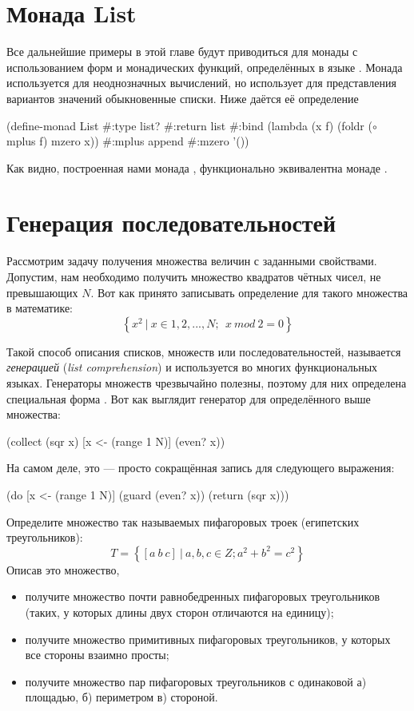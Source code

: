 \section[2]{Монада List}%
Все дальнейшие примеры в этой главе будут приводиться для монады  с использованием форм и монадических функций, определённых в языке \Scheme. Монада  используется для неоднозначных вычислений, но использует для представления вариантов значений обыкновенные списки. Ниже даётся её определение  

\begin{SchemeCode}
(define-monad List
  #:type list?
  #:return list
  #:bind (lambda (x f) (foldr ($\circ$ mplus f) mzero x))
  #:mplus append
  #:mzero '())
\end{SchemeCode}

Как видно, построенная нами монада , функционально эквивалентна монаде .

\section{Генерация последовательностей}%
Рассмотрим задачу получения множества величин с заданными свойствами. Допустим, нам необходимо получить множество квадратов чётных чисел, не превышающих $N$.  Вот как принято записывать определение для такого множества в математике:  $$\left\{ x^2~|~x \in {1, 2, ..., N};~~ x~mod~2 = 0 \right\}$$

Такой способ описания списков, множеств или последовательностей, называется \emph{генерацией} (\emph{list comprehension}) и используется во многих функциональных языках. Генераторы множеств чрезвычайно полезны, поэтому для них определена специальная форма .
Вот как выглядит генератор для определённого выше множества:
\begin{SchemeCode}[emph={x,N}]
  (collect (sqr x) [x <- (range 1 N)] (even? x))
\end{SchemeCode}
\noindent
На самом деле, это --- просто сокращённая запись для следующего выражения:
\begin{SchemeCode}[emph={x,N}]
  (do [x <- (range 1 N)]
      (guard (even? x))
      (return (sqr x)))
\end{SchemeCode}

\begin{Assignment}
Определите множество так называемых пифагоровых троек (египетских треугольников):
$$T = \left\{ [a~b~c]~|~a,b,c \in Z; a^2 + b^2 = c^2 \right\}$$
Описав это множество,
\begin{itemize}
  \item получите множество почти равнобедренных пифагоровых треугольников (таких, у которых длины двух сторон отличаются на единицу);
  \item получите множество примитивных пифагоровых треугольников, у которых все стороны взаимно просты;
  \item получите множество пар пифагоровых треугольников с одинаковой а) площадью, б) периметром в) стороной.
\end{itemize}
\end{Assignment}



